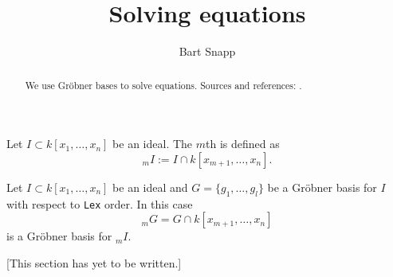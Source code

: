 \documentclass{article}
\author{Bart Snapp}
\title{Solving equations}
\begin{document}
\begin{abstract}
  We use Gr\"obner bases to solve equations. Sources and references:
  \cite{CLO2007,hS2003}.
\end{abstract}
\maketitle

\begin{definition}
  Let $I\subset k[x_1,\dots,x_n]$ be an ideal. The $m$th
   is defined as
  \[
  _mI := I \cap k[x_{m+1},\dots, x_n].
  \]
\end{definition}

\begin{theorem}
  Let $I\subset k[x_1,\dots,x_n]$ be an ideal and $G = \{g_1,\dots,
  g_l\}$ be a Gr\"obner basis for $I$ with respect to \texttt{Lex}
  order. In this case
  \[
  _m G = G \cap k[x_{m+1},\dots, x_n]
  \]
  is a Gr\"obner basis for $_m I$.
\end{theorem}

[This section has yet to be written.]
\end{document}
